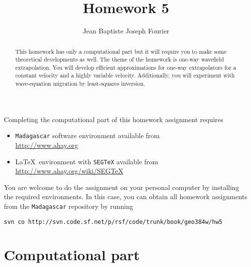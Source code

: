 \author{Jean Baptiste Joseph Fourier} 
\title{Homework 5}

\begin{abstract}
  This homework has only a computational part but it will require you
  to make some theoretical developments as well.  The theme of the
  homework is one-way wavefield extrapolation. You will develop
  efficient approximations for one-way extrapolators for a constant
  velocity and a highly variable velocity. Additionally, you will
  experiment with wave-equation migration by least-squares inversion.
\end{abstract}

Completing the computational part of this homework assignment requires
\begin{itemize}
\item \texttt{Madagascar} software environment available from \\
  \url{http://www.ahay.org}
\item \LaTeX\ environment with \texttt{SEGTeX} available from \\ 
  \url{http://www.ahay.org/wiki/SEGTeX}
\end{itemize}

You are welcome to do the assignment on your personal computer by
installing the required environments. In this case, you can obtain all
homework assignments from the \texttt{Madagascar} repository by running
\begin{verbatim}
svn co http://svn.code.sf.net/p/rsf/code/trunk/book/geo384w/hw5
\end{verbatim}

\section{Computational part}

